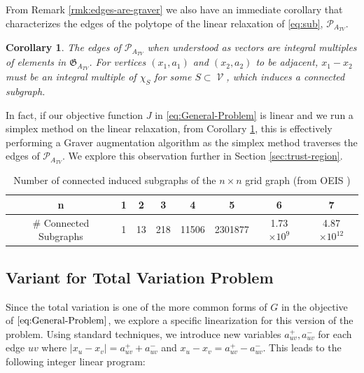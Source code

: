 \documentclass[pdflatex,sn-mathphys-num]{sn-jnl}%
\newtheorem{corollary}[theorem]{Corollary}
\DeclareMathOperator{\Vcal}{\mathcal{V}}
\begin{document}
% 

From Remark \ref{rmk:edges-are-graver} we also have an immediate corollary that characterizes the edges of the polytope of the linear relaxation of \eqref{eq:sub}, $\mathcal{P}_{A_{TV}}$.

\begin{corollary}\label{cor:edges-are-connected}
    The edges of $\mathcal{P}_{A_{TV}}$ when understood as vectors are integral multiples of elements in $\mathfrak{G}_{A_{TV}}$. For vertices $(x_1, a_1)$ and $(x_2, a_2)$ to be adjacent, $x_1 - x_2$ must be an integral multiple of $\chi_S$ for some $S \subset \Vcal$, which induces a connected subgraph.
\end{corollary}

In fact, if our objective function $J$ in \eqref{eq:General-Problem} is linear and we run a simplex method on the linear relaxation, from Corollary \ref{cor:edges-are-connected}, this is effectively performing a Graver augmentation algorithm as the simplex method traverses the edges of $\mathcal{P}_{A_{TV}}$. We explore this observation further in Section \ref{sec:trust-region}.


\begin{table}[]
    \centering
    \begin{tabular}{c|c|c|c|c|c|c|c}
    n & 1 & 2 & 3 & 4 & 5 & 6 & 7 \\ \hline
	\# Connected Subgraphs & 1 & 13 & 218 & 11506 & 2301877 & 1.73 $\times 10^9$ & 4.87 $\times 10^{12}$  \end{tabular}
    \caption{Number of connected induced subgraphs of the $n \times n$ grid graph (from OEIS \cite[A059525]{oeis})}
    \label{tab:connected-graph-count}
\end{table}



\subsection{Variant for Total Variation Problem}
Since the total variation is one of the more common forms of $G$ in the objective of $\eqref{eq:General-Problem}$, we explore a specific linearization for this version of the problem.
Using standard techniques, we introduce new variables $a_{uv}^+, a_{uv}^-$ for each edge $uv$ where $|x_u - x_v| = a_{uv}^+ + a_{uv}^-$ and $x_u - x_v = a_{uv}^+ - a_{uv}^-$. This leads to the following integer linear program:
\end{document}
